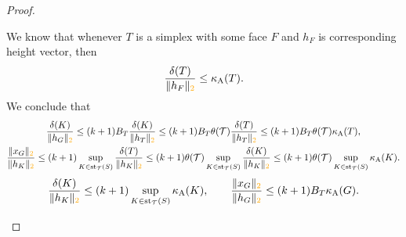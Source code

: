 \documentclass[10pt,letterpaper]{article}
\newcommand\cye[1]{%
  \protect\leavevmode
  \begingroup
    \color{red!35!yellow}%
    #1%
  \endgroup
}
\begin{document}
\begin{proof}
\begin{itemize}
        We know that whenever $T$ is a simplex with some face $F$ and $h_F$ is corresponding height vector, then 
        \begin{align*}
            \frac{\diam(T)}{ \|h_{F}\|_{\cye{2}}}
            \leq  
            \kappa_{\maxcol}(T)
            .
        \end{align*}
        We conclude that 
        \begin{gather*}
            \frac{ \diam(K) }{ \| h_{{G}} \|_{\cye{2}} }
            \leq 
            (k+1)B_{T}
            \frac{ \diam(K) }{ \| h_{T} \|_{\cye{2}} }
            \leq 
            (k+1)B_{T}
            \theta(\calT)
            \frac{ \diam(T) }{ \| h_{T} \|_{\cye{2}} }
            \leq 
            (k+1)B_{T}
            \theta(\calT)
            \kappa_{\maxcol}(T) %
            ,
            \\
            \frac{ \| x_{G} \|_{\cye{2}} }{ \| h_{K} \|_{\cye{2}} }
            \leq 
            (k+1)
            \sup_{ K \in \patch_{\calT}(S) }
            \frac{ \diam(T) }{ \| h_{K} \|_{\cye{2}} }
            \leq 
            (k+1)
            \theta(\calT)
            \sup_{ K \in \patch_{\calT}(S) }
            \frac{ \diam(K) }{ \| h_{K} \|_{\cye{2}} }
            \leq 
            (k+1)
            \theta(\calT)
            \sup_{ K \in \patch_{\calT}(S) }
            \kappa_{\maxcol}(K) %
            .
        \end{gather*}
        \begin{gather*}
            \frac{ \diam(K) }{ \| h_{{K}} \|_{\cye{2}} }
            \leq 
            (k+1)
            \sup_{ K \in \patch_{\calT}(S) }
            \kappa_{\maxcol}(K) %
            ,
            \qquad 
            \frac{ \| x_{G} \|_{\cye{2}} }{ \| h_{G} \|_{\cye{2}} }
            \leq 
            (k+1)B_{T}
            \kappa_{\maxcol}({G}) %
            .
        \end{gather*}

        
        

\end{itemize}
\end{proof}
\end{document}
